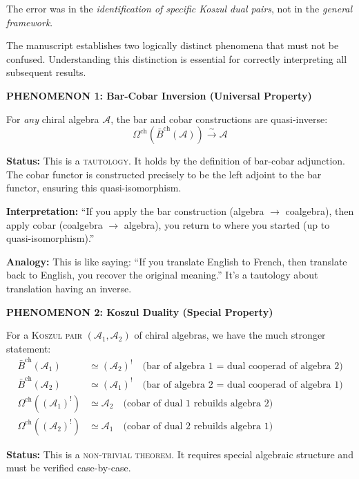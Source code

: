 The error was in the \emph{identification of specific Koszul dual pairs}, not in the \emph{general framework}.

\begin{remark}\label{rem:inversion-vs-duality-distinguished}
The manuscript establishes two logically distinct phenomena that must not be confused. Understanding this distinction is essential for correctly interpreting all subsequent results.

\medskip
\noindent\textbf{PHENOMENON 1: Bar-Cobar Inversion (Universal Property)}

For \emph{any} chiral algebra $\mathcal{A}$, the bar and cobar constructions are quasi-inverse:
$$\Omega^{\text{ch}}(\bar{B}^{\text{ch}}(\mathcal{A})) \xrightarrow{\sim} \mathcal{A}$$

\textbf{Status:} This is a \textsc{tautology}. It holds by the definition of bar-cobar adjunction. The cobar functor is constructed precisely to be the left adjoint to the bar functor, ensuring this quasi-isomorphism.

\textbf{Interpretation:} ``If you apply the bar construction (algebra $\to$ coalgebra), then apply cobar (coalgebra $\to$ algebra), you return to where you started (up to quasi-isomorphism).''

\textbf{Analogy:} This is like saying: ``If you translate English to French, then translate back to English, you recover the original meaning.'' It's a tautology about translation having an inverse.

\medskip
\noindent\textbf{PHENOMENON 2: Koszul Duality (Special Property)}

For a \textsc{Koszul pair} $(\mathcal{A}_1, \mathcal{A}_2)$ of chiral algebras, we have the much stronger statement:
\begin{align*}
\bar{B}^{\text{ch}}(\mathcal{A}_1) &\simeq (\mathcal{A}_2)^! \quad \text{(bar of algebra 1 = dual cooperad of algebra 2)} \\
\bar{B}^{\text{ch}}(\mathcal{A}_2) &\simeq (\mathcal{A}_1)^! \quad \text{(bar of algebra 2 = dual cooperad of algebra 1)} \\
\Omega^{\text{ch}}((\mathcal{A}_1)^!) &\simeq \mathcal{A}_2 \quad \text{(cobar of dual 1 rebuilds algebra 2)} \\
\Omega^{\text{ch}}((\mathcal{A}_2)^!) &\simeq \mathcal{A}_1 \quad \text{(cobar of dual 2 rebuilds algebra 1)}
\end{align*}

\textbf{Status:} This is a \textsc{non-trivial theorem}. It requires special algebraic structure and must be verified case-by-case.


\end{remark}
